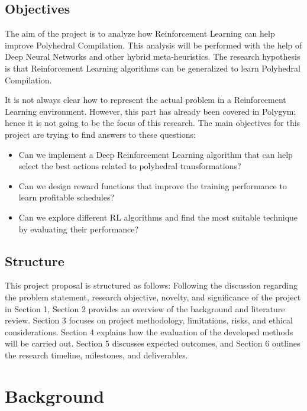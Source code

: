 \documentclass[logo,msc]{infthesis}           %
\begin{document}
\section{Objectives}

The aim of the project is to analyze how Reinforcement Learning can help improve Polyhedral Compilation. This analysis will be performed with the help of Deep Neural Networks and other hybrid meta-heuristics. The research hypothesis is that Reinforcement Learning algorithms can be generalized to learn Polyhedral Compilation.

It is not always clear how to represent the actual problem in a Reinforcement Learning environment. However, this part has already been covered in Polygym\cite{9563041}; hence it is not going to be the focus of this research. The main objectives for this project are trying to find answers to these questions:
\begin{itemize}

    \item Can we implement a Deep Reinforcement Learning algorithm that can help select the best actions related to polyhedral transformations? 
    \item Can we design reward functions that improve the training performance to learn profitable schedules?
    \item Can we explore different RL algorithms and find the most suitable technique by evaluating their performance?


\end{itemize}

\section{Structure}

This project proposal is structured as follows: Following the discussion regarding the problem statement, research objective, novelty, and significance of the project in Section 1, Section 2 provides an overview of the background and literature review. Section 3 focuses on project methodology, limitations, risks, and ethical considerations. Section 4 explains how the evaluation of the developed methods will be carried out. Section 5 discusses expected outcomes, and Section 6 outlines the research timeline, milestones, and deliverables.

\chapter{Background}
\end{document}
